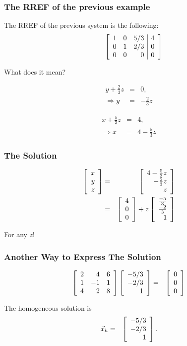 \begin{frame}
  \frametitle{The RREF of the previous example}

  The RREF of the previous system is the following:
  \begin{eqnarray*}
    \stateThree{~}{~}{~}
    \startRowOps
    \oneRowOps{1}{0}{5/3}{4} 
    \oneRowOps{0}{1}{2/3}{0} 
    \oneRowOps{0}{0}{0}{0} 
    \stopRowOps    
  \end{eqnarray*}

  What does it mean?

  \begin{eqnarray*}
    y + \frac{2}{3}z & = & 0, \\
    \Rightarrow y & = & -\frac{2}{3} z
  \end{eqnarray*}

  {
    \begin{eqnarray*}
      x + \frac{5}{3} z & = & 4, \\
      \Rightarrow x & = & 4 - \frac{5}{3} z
    \end{eqnarray*}
  }

\end{frame}

\begin{frame}
  \frametitle{The Solution}

  \begin{eqnarray*}
    \left[ \begin{array}{r} x \\ y \\ z \end{array} \right] & = & \left[ \begin{array}{r} 4 - \frac{5}{3}z \\ -\frac{2}{3}z \\ z \end{array} \right] \\
    & = & \left[ \begin{array}{r} 4 \\ 0 \\ 0 \end{array} \right] + z \left[ \begin{array}{r} \frac{-5}{3} \\ \frac{-2}{3} \\ 1 \end{array} \right]
  \end{eqnarray*}

  For any $z$!
  
\end{frame}

\begin{frame}
  \frametitle{Another Way to Express The Solution}
  
  \begin{eqnarray*}
    \left[ \begin{array}{rrr} 2 & 4 & 6 \\ 1 & -1 & 1 \\ 4 & 2 & 8 \end{array} \right] \left[ \begin{array}{r} -5/3 \\ -2/3 \\ 1 \end{array} \right] 
    & = & \left[ \begin{array}{r} 0 \\ 0 \\ 0 \end{array} \right]
  \end{eqnarray*}

  The homogeneous solution is 
  \begin{eqnarray*}
    \vec{x}_h & = & \left[ \begin{array}{r} -5/3 \\ -2/3 \\ 1 \end{array} \right]. 
  \end{eqnarray*}

\end{frame}

